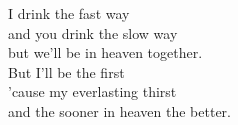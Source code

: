 
I drink the fast way \\ and you drink the slow way \\ but we'll be in heaven together. \\ But I'll be the first \\ 'cause my everlasting thirst \\ and the sooner in heaven the better.